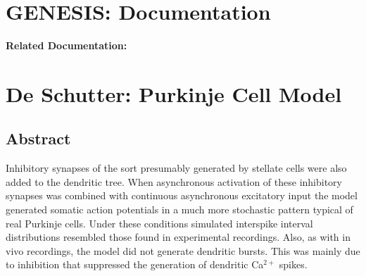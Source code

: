 \documentclass[12pt]{article}
\begin{document}
\section*{GENESIS: Documentation}

{\bf Related Documentation:}

\section*{De Schutter: Purkinje Cell Model}

\subsection*{Abstract}

Inhibitory synapses of the sort presumably generated by stellate
cells were also added to the dendritic tree. When asynchronous
activation of these inhibitory synapses was combined with
continuous asynchronous excitatory input the model generated
somatic action potentials in a much more stochastic pattern typical
of real Purkinje cells. Under these conditions simulated interspike
interval distributions resembled those found in experimental
recordings. Also, as with in vivo recordings, the model did not
generate dendritic bursts. This was mainly due to inhibition that
suppressed the generation of dendritic Ca$^{2+}$ spikes.
\end{document}
